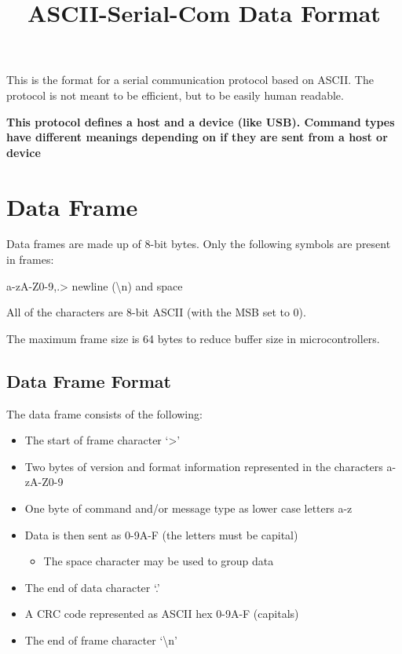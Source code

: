 \documentclass{customdocclass}
\title{ASCII-Serial-Com Data Format}
\begin{document}
\maketitle

This is the format for a serial communication protocol based on ASCII. The
protocol is not meant to be efficient, but to be easily human readable.

\textbf{This protocol defines a host and a device (like USB). Command types
have different meanings depending on if they are sent from a host or device}

\section{Data Frame}

Data frames are made up of 8-bit bytes. Only the following symbols are present in frames:

\vspace{1em}

a-zA-Z0-9,.> newline (\textbackslash n) and space

\vspace{1em}

All of the characters are 8-bit ASCII (with the MSB set to 0).

The maximum frame size is 64 bytes to reduce buffer size in microcontrollers.

\subsection{Data Frame Format}

The data frame consists of the following:

\begin{itemize}
  \item The start of frame character `>'
  \item Two bytes of version and format information represented in the characters a-zA-Z0-9
  \item One byte of command and/or message type as lower case letters a-z
  \item Data is then sent as 0-9A-F (the letters must be capital)
  \begin{itemize}
    \item The space character may be used to group data
  \end{itemize}
  \item The end of data character `.'
  \item A CRC code represented as ASCII hex 0-9A-F (capitals)
  \item The end of frame character `\textbackslash n'
\end{itemize}
\end{document}
